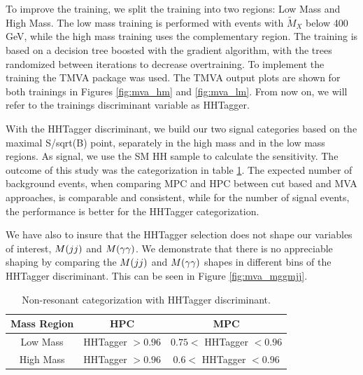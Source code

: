 To improve the training, we split the training into two regions: Low Mass and High Mass. 
The low mass training is performed with events with $\tilde{M}_{X}$ below 400 GeV, while the high mass training uses the complementary region. 
The training is based on a decision tree boosted with the gradient algorithm, with the trees randomized between iterations to decrease overtraining. 
To implement the training the TMVA package was used. 
The TMVA output plots are shown for both trainings in Figures \ref{fig:mva_hm} and \ref{fig:mva_lm}. 
From now on, we will refer to the trainings discriminant variable as HHTagger.

With the HHTagger discriminant, we build our two signal categories based on the maximal S/sqrt(B) point, separately in the high mass and in the low mass regions. 
As signal, we use the SM HH sample to calculate the sensitivity. 
The outcome of this study was the categorization in table \ref{tab:catmva}. 
The expected number of background events, when comparing MPC and HPC between cut based and MVA approaches, is comparable and consistent, while for the number of signal events, the performance is better for the HHTagger categorization. 

We have also to insure that the HHTagger selection does not shape our variables of interest, $M(jj)$ and $M(\gamma\gamma)$. 
We demonstrate that there is no appreciable shaping by comparing the $M(jj)$ and $M(\gamma\gamma)$ shapes in different bins of the HHTagger discriminant. 
This can be seen in Figure \ref{fig:mva_mggmjj}. 

\begin{table}
\centering
    \begin{tabular}{| c | c | c |}
    \hline
    Mass Region & HPC & MPC \\ \hline
    Low Mass & HHTagger $> 0.96$ & $ 0.75 < $ HHTagger $ < 0.96 $ \\ \hline 
    High Mass & HHTagger $> 0.96$ & $ 0.6 < $ HHTagger $ < 0.96 $ \\ \hline 
    \end{tabular}
\caption{Non-resonant categorization with HHTagger discriminant.}
\label{tab:catmva}
\end{table}


